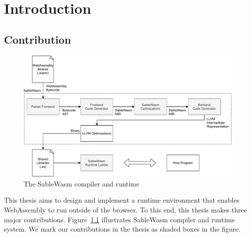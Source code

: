 \chapter{Introduction}


\section*{Contribution}

\begin{figure}
    \centering
    \includegraphics[width=\textwidth]{Images/design}
    \caption{The SableWasm compiler and runtime}
    \label{fig:design}
\end{figure}

This thesis aims to design and implement a runtime environment that enables WebAssembly to run outside of the browser. To this end, this thesis makes three major contributions. Figure~\ref{fig:design} illustrates SableWasm compiler and runtime system. We mark our contributions in the thesis as shaded boxes in the figure. 

